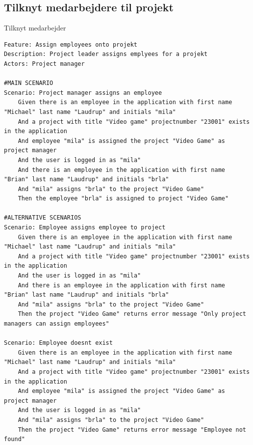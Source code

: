 \subsection{Tilknyt medarbejdere til projekt}
\begin{listing}[H]
    \centering
    \caption{Tilknyt medarbejder}\label{lst:assign_employ}
    \begin{verbatim}
Feature: Assign employees onto projekt
Description: Project leader assigns emplyees for a projekt
Actors: Project manager

#MAIN SCENARIO
Scenario: Project manager assigns an employee
    Given there is an employee in the application with first name "Michael" last name "Laudrup" and initials "mila"
    And a project with title "Video game" projectnumber "23001" exists in the application
    And employee "mila" is assigned the project "Video Game" as project manager
    And the user is logged in as "mila"
    And there is an employee in the application with first name "Brian" last name "Laudrup" and initials "brla"
    And "mila" assigns "brla" to the project "Video Game"
    Then the employee "brla" is assigned to project "Video Game"

#ALTERNATIVE SCENARIOS
Scenario: Employee assigns employee to project
    Given there is an employee in the application with first name "Michael" last name "Laudrup" and initials "mila"
    And a project with title "Video game" projectnumber "23001" exists in the application
    And the user is logged in as "mila"
    And there is an employee in the application with first name "Brian" last name "Laudrup" and initials "brla"
    And "mila" assigns "brla" to the project "Video Game"
    Then the project "Video Game" returns error message "Only project managers can assign employees"

Scenario: Employee doesnt exist
    Given there is an employee in the application with first name "Michael" last name "Laudrup" and initials "mila"
    And a project with title "Video game" projectnumber "23001" exists in the application
    And employee "mila" is assigned the project "Video Game" as project manager
    And the user is logged in as "mila"
    And "mila" assigns "brla" to the project "Video Game"
    Then the project "Video Game" returns error message "Employee not found"
    \end{verbatim}
\end{listing}
